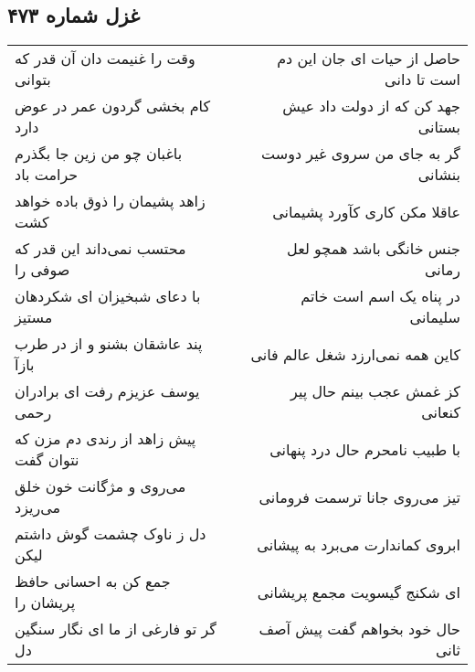\begin{center}
\section*{غزل شماره ۴۷۳}
\label{sec:sh473}
\begin{longtable}{l p{0.5cm} r}
وقت را غنیمت دان آن قدر که بتوانی
&&
حاصل از حیات ای جان این دم است تا دانی
\\
کام بخشی گردون عمر در عوض دارد
&&
جهد کن که از دولت داد عیش بستانی
\\
باغبان چو من زین جا بگذرم حرامت باد
&&
گر به جای من سروی غیر دوست بنشانی
\\
زاهد پشیمان را ذوق باده خواهد کشت
&&
عاقلا مکن کاری کآورد پشیمانی
\\
محتسب نمی‌داند این قدر که صوفی را
&&
جنس خانگی باشد همچو لعل رمانی
\\
با دعای شبخیزان ای شکردهان مستیز
&&
در پناه یک اسم است خاتم سلیمانی
\\
پند عاشقان بشنو و از در طرب بازآ
&&
کاین همه نمی‌ارزد شغل عالم فانی
\\
یوسف عزیزم رفت ای برادران رحمی
&&
کز غمش عجب بینم حال پیر کنعانی
\\
پیش زاهد از رندی دم مزن که نتوان گفت
&&
با طبیب نامحرم حال درد پنهانی
\\
می‌روی و مژگانت خون خلق می‌ریزد
&&
تیز می‌روی جانا ترسمت فرومانی
\\
دل ز ناوک چشمت گوش داشتم لیکن
&&
ابروی کماندارت می‌برد به پیشانی
\\
جمع کن به احسانی حافظ پریشان را
&&
ای شکنج گیسویت مجمع پریشانی
\\
گر تو فارغی از ما ای نگار سنگین دل
&&
حال خود بخواهم گفت پیش آصف ثانی
\\
\end{longtable}
\end{center}
